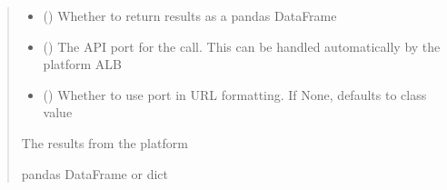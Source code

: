 \documentclass[letterpaper,10pt,english]{sphinxmanual}
\begin{document}
\begin{fulllineitems}
\begin{fulllineitems}
\begin{quote}
\begin{description}
\begin{itemize}
\item {} 
\sphinxAtStartPar
{} (\sphinxstyleliteralemphasis{\sphinxupquote{ (}}\sphinxstyleliteralemphasis{\sphinxupquote{)}}) \textendash{} Whether to return results as a pandas DataFrame

\item {} 
\sphinxAtStartPar
{} (\sphinxstyleliteralemphasis{\sphinxupquote{ (}}\sphinxstyleliteralemphasis{\sphinxupquote{)}}) \textendash{} The API port for the call. This can be handled automatically by the platform ALB

\item {} 
\sphinxAtStartPar
{} (\sphinxstyleliteralemphasis{\sphinxupquote{ (}}\sphinxstyleliteralemphasis{\sphinxupquote{)}}) \textendash{} Whether to use port in URL formatting. If None, defaults to class value

\end{itemize}

\sphinxAtStartPar
{} \textendash{} The results from the platform

\sphinxAtStartPar
pandas DataFrame or dict

\end{description}\end{quote}

\end{fulllineitems}



\end{fulllineitems}
\end{document}
